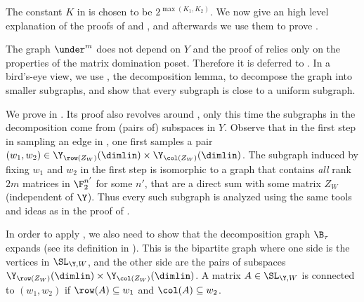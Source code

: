 The constant \(K\) in  is chosen to be \(2^{\max(K_1,K_2)}\). We now give an high level explanation of the proofs of  and , and afterwards we use them to prove .

The graph \(\under^m\) does not depend on \(Y\) and the proof of  relies only on the properties of the matrix domination poset. Therefore it is deferred to . In a bird's-eye view, we use , the decomposition lemma, to decompose the graph into smaller subgraphs, and show that every subgraph is close to a uniform subgraph. %

We prove  in . Its proof also revolves around , only this time the subgraphs in the decomposition come from (pairs of) subspaces in \(Y\). Observe that in the first step in sampling an edge in , one first samples a pair \((w_1,w_2) \in \Y_{\row(Z_W)}(\dimlin)\times \Y_{\col(Z_W)}(\dimlin)\). The subgraph induced by fixing \(w_1\) and \(w_2\) in the first step is isomorphic to a graph that contains \emph{all} rank \(2m\) matrices in \(\F_2^{n'}\) for some \(n'\), that are a direct sum with some matrix \(Z_W\) (independent of \(\Y\)). Thus every such subgraph is analyzed using the same tools and ideas as in the proof of . 

In order to apply , we also need to show that the decomposition graph \(\B_\tau\) expands (see its definition in ). This is the bipartite graph where one side is the vertices in \(\SL_{\Y,W}\), and the other side are the pairs of subspaces \(\Y_{\row(Z_W)}(\dimlin)\times \Y_{\col(Z_W)}(\dimlin)\). A matrix \(A \in \SL_{\Y,W}\) is connected to \((w_1,w_2)\) if \(\row(A) \subseteq w_1\) and \(\col(A) \subseteq w_2\).

